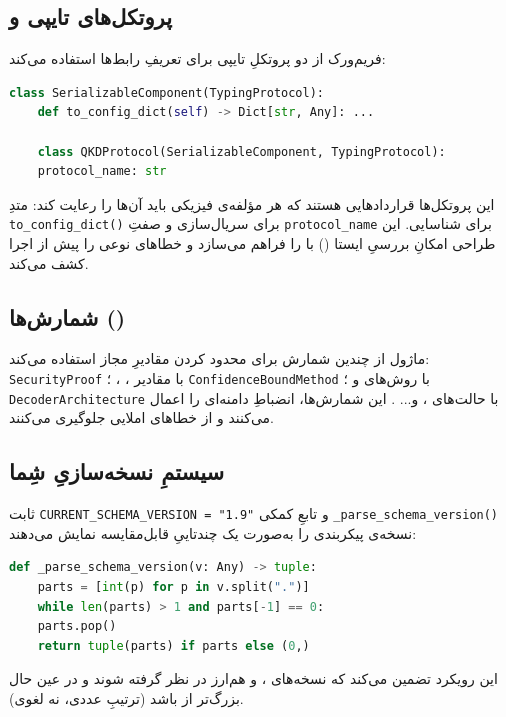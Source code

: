 \subsection{پروتکل‌های تایپی و }

فریم‌ورک از دو پروتکلِ تایپی برای تعریفِ رابط‌ها استفاده می‌کند:

\begin{lstlisting}[language=Python]
	class SerializableComponent(TypingProtocol):
	def to_config_dict(self) -> Dict[str, Any]: ...
	
	class QKDProtocol(SerializableComponent, TypingProtocol):
	protocol_name: str
\end{lstlisting}

این پروتکل‌ها قراردادهایی هستند که هر مؤلفه‌ی فیزیکی باید آن‌ها را رعایت کند: متدِ \texttt{to\_config\_dict()} برای سریال‌سازی و صفتِ \texttt{protocol\_name} برای شناسایی. این طراحی امکانِ بررسیِ ایستا () با  را فراهم می‌سازد و خطاهای نوعی را پیش از اجرا کشف می‌کند.

\subsection{شمارش‌ها ()}

ماژول از چندین شمارش برای محدود کردن مقادیرِ مجاز استفاده می‌کند: \texttt{SecurityProof} با مقادیر ، ، ؛ \texttt{ConfidenceBoundMethod} با روش‌های  و ؛ \texttt{DecoderArchitecture} با حالت‌های ،  و... . این شمارش‌ها، انضباطِ دامنه‌ای را اعمال می‌کنند و از خطاهای املایی جلوگیری می‌کنند.

\subsection{سیستمِ نسخه‌سازیِ شِما}

ثابت \texttt{CURRENT\_SCHEMA\_VERSION = "1.9"} و تابعِ کمکی \texttt{\_parse\_schema\_version()} نسخه‌ی پیکربندی را به‌صورت یک چندتاییِ قابل‌مقایسه نمایش می‌دهند:

\begin{lstlisting}[language=Python]
	def _parse_schema_version(v: Any) -> tuple:
	parts = [int(p) for p in v.split(".")]
	while len(parts) > 1 and parts[-1] == 0:
	parts.pop()
	return tuple(parts) if parts else (0,)
\end{lstlisting}

این رویکرد تضمین می‌کند که نسخه‌های ،  و  هم‌ارز در نظر گرفته شوند و در عین حال  بزرگ‌تر از  باشد (ترتیبِ عددی، نه لغوی).

